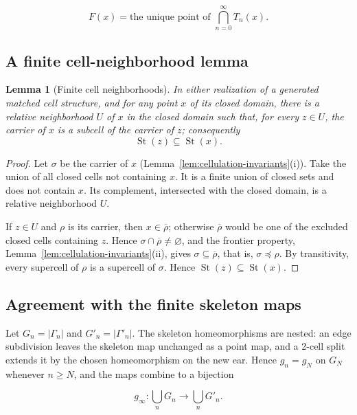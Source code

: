 \documentclass[11pt]{article}
\theoremstyle{mainplain}
\newtheorem{lemma}[theorem]{Lemma}
\theoremstyle{mainroman}
\theoremstyle{definition}
\numberwithin{equation}{section}
\begin{document}
\[
F(x)
 =
 \text{the unique point of }\bigcap_{n=0}^\infty T_n(x).
\]

\subsection{A finite cell-neighborhood lemma}\label{a-finite-cell-neighborhood-lemma}

\begin{lemma}[Finite cell neighborhoods]\label{lem:cell-neighborhood}
In either realization of a generated matched cell structure, and for any point \(x\) of its closed domain, there is a relative neighborhood \(U\) of \(x\) in the closed domain such that, for every \(z\in U\), the
carrier of $x$ is a subcell of the carrier of $z$; consequently
\[
\operatorname{St}(z)\subseteq\operatorname{St}(x).
\]
\end{lemma}
\begin{proof}
Let \(\sigma\) be the carrier of \(x\)
(Lemma~\ref{lem:cellulation-invariants}\textup{(i)}). Take the union of all closed cells not containing \(x\). It is a finite union of closed sets and does not contain \(x\). Its complement, intersected with the closed domain, is a relative neighborhood \(U\).

If \(z\in U\) and \(\rho\) is its carrier, then \(x\in\overline\rho\); otherwise \(\overline\rho\) would be one of the excluded closed cells containing \(z\). Hence \(\sigma\cap\overline\rho\ne\varnothing\), and the frontier property, Lemma~\ref{lem:cellulation-invariants}\textup{(ii)}, gives \(\sigma\subseteq\overline\rho\), that is, \(\sigma\preceq\rho\). By transitivity, every supercell of \(\rho\) is a supercell of \(\sigma\). Hence \(\operatorname{St}(z)\subseteq\operatorname{St}(x)\). \end{proof}

\subsection{Agreement with the finite skeleton maps}\label{agreement-with-the-finite-skeleton-maps}

Let \(G_n=|\Gamma_n|\) and \(G'_n=|\Gamma'_n|\). The skeleton
homeomorphisms are nested: an edge subdivision leaves the skeleton map
unchanged as a point map, and a 2-cell split extends it by the chosen
homeomorphism on the new ear. Hence \(g_n=g_N\) on \(G_N\) whenever
\(n\ge N\), and the maps combine to a bijection

\[
g_\infty:\bigcup_nG_n\longrightarrow\bigcup_nG'_n.
\]
\end{document}
